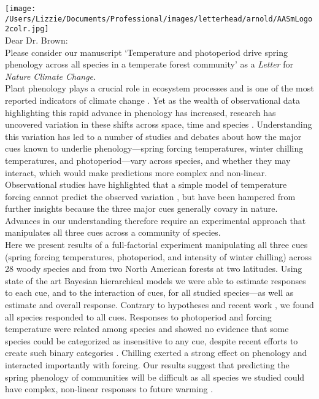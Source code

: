 \documentclass[11pt,a4paper]{article}
\begin{document}
\noindent \texttt{[image: /Users/Lizzie/Documents/Professional/images/letterhead/arnold/AASmLogo2colr.jpg]}
\vspace{1ex}\\

\noindent Dear Dr. Brown: %
\vspace{1.5ex}\\
\noindent Please consider our manuscript `Temperature and photoperiod drive spring phenology across all species in a temperate forest community' as a \emph{Letter} for \emph{Nature Climate Change.} 
\vspace{1.5ex}\\
Plant phenology plays a crucial role in ecosystem processes and is one of the most reported indicators of climate change \citep{Cleland:2007aa,piao2017,sippel2016}. Yet as the wealth of observational data highlighting this rapid advance in phenology has increased, research has uncovered variation in these shifts across space, time and species \citep{Rutishauser:2008fu,Wolkovich:2012aa,fu2015}. Understanding this variation has led to a number of studies and debates \citep[e.g.,][]{Korner:2010,Chuine:xb} about how the major cues known to underlie phenology---spring forcing temperatures, winter chilling temperatures, and photoperiod---vary across species, and whether they may interact, which would make predictions more complex and non-linear. Observational studies have highlighted that a simple model of temperature forcing cannot predict the observed variation \citep{Rutishauser:2008fu,fu2015,carter2017}, but have been hampered from further insights because the three major cues generally covary in nature. Advances in our understanding therefore require an experimental approach that manipulates all three cues across a community of species. 
\vspace{1.5ex}\\
Here we present results of a full-factorial experiment manipulating all three cues (spring forcing temperatures, photoperiod, and intensity of winter chilling) across 28 woody species and from two North American forests at two latitudes. Using state of the art Bayesian hierarchical models we were able to estimate responses to each cue, and to the interaction of cues, for all studied species---as well as estimate and overall response. Contrary to hypotheses \citep{Korner:2010} and recent work \citep[using methods that do not manipulate all cues,][]{zohner2016ncc}, we found all species responded to all cues. Responses to photoperiod and forcing temperature were related among species and showed no evidence that some species could be categorized as insensitive to any cue, despite recent efforts to create such binary categories \citep{laube2014gcb,zohner2016ncc,donnelly2017}. Chilling exerted a strong effect on phenology and interacted importantly with forcing. Our results suggest that predicting the spring phenology of communities will be difficult as all species we studied could have complex, non-linear responses to future warming \citep{Chuine:1999aa}. 
\end{document}
